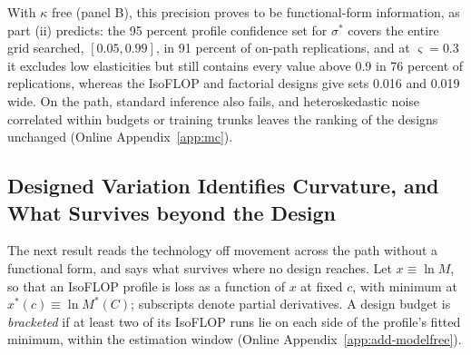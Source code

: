 With $\kappa$ free (panel B), this precision proves to be functional-form information, as part (ii) predicts: the 95
percent profile confidence set for $\sigma^*$ covers the entire grid searched, $[0.05,0.99]$, in 91 percent of on-path
replications, and at $\varsigma=0.3$ it excludes low elasticities but still contains
every value above 0.9 in 76 percent of replications, whereas the IsoFLOP and factorial designs give sets 0.016 and 0.019
wide. On the path, standard inference also fails, and heteroskedastic noise correlated within budgets or training trunks
leaves the ranking of the designs unchanged (Online Appendix~\ref{app:mc}).

\subsection{Designed Variation Identifies Curvature, and What Survives beyond the Design}\label{sec:ident-modelfree}

The next result reads the technology off movement across the path without a functional form, and says what survives
where no design reaches. Let
$x\equiv\ln M$, so that an IsoFLOP profile is loss as a function of $x$ at fixed $c$, with minimum at
$x^*(c)\equiv\ln M^*(C)$; subscripts denote partial derivatives. A design budget is \emph{bracketed} if at least two of its IsoFLOP
runs lie on each side of the profile's fitted minimum, within the estimation window (Online
Appendix~\ref{app:add-modelfree}).

